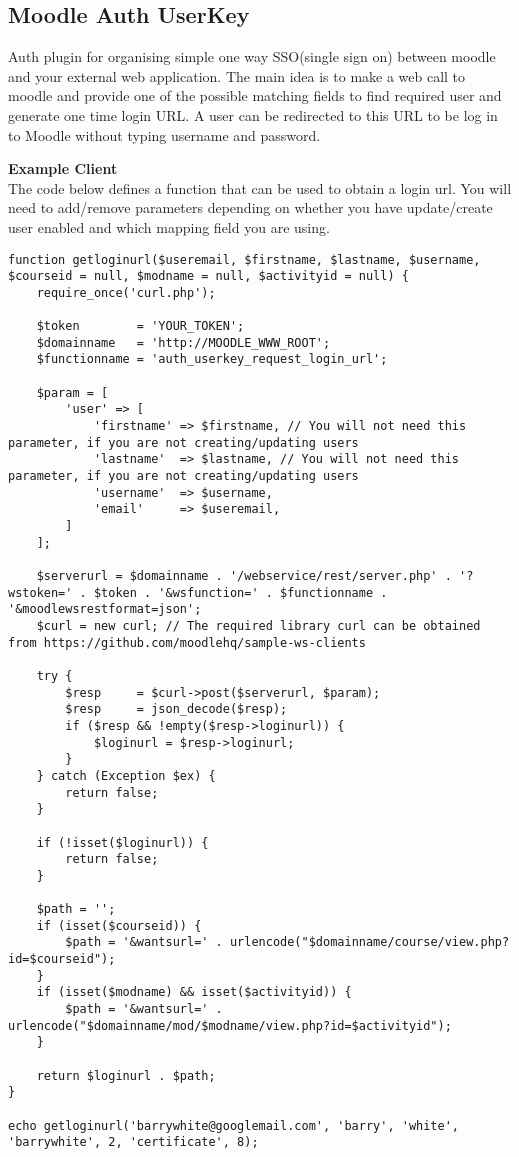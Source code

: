 \subsection{Moodle Auth UserKey}
Auth plugin for organising simple one way SSO(single sign on) between moodle and your external web application. The main idea is to make a web call to moodle and provide one of the possible matching fields to find required user and generate one time login URL. A user can be redirected to this URL to be log in to Moodle without typing username and password.

\textbf{Example Client}\\
The code below defines a function that can be used to obtain a login url. You will need to add/remove parameters depending on whether you have update/create user enabled and which mapping field you are using.

\begin{verbatim}
function getloginurl($useremail, $firstname, $lastname, $username, $courseid = null, $modname = null, $activityid = null) {
    require_once('curl.php');
        
    $token        = 'YOUR_TOKEN';
    $domainname   = 'http://MOODLE_WWW_ROOT';
    $functionname = 'auth_userkey_request_login_url';

    $param = [
        'user' => [
            'firstname' => $firstname, // You will not need this parameter, if you are not creating/updating users
            'lastname'  => $lastname, // You will not need this parameter, if you are not creating/updating users
            'username'  => $username, 
            'email'     => $useremail,
        ]
    ];

    $serverurl = $domainname . '/webservice/rest/server.php' . '?wstoken=' . $token . '&wsfunction=' . $functionname . '&moodlewsrestformat=json';
    $curl = new curl; // The required library curl can be obtained from https://github.com/moodlehq/sample-ws-clients 

    try {
        $resp     = $curl->post($serverurl, $param);
        $resp     = json_decode($resp);
        if ($resp && !empty($resp->loginurl)) {
            $loginurl = $resp->loginurl;        
        }
    } catch (Exception $ex) {
        return false;
    }

    if (!isset($loginurl)) {
        return false;
    }

    $path = '';
    if (isset($courseid)) {
        $path = '&wantsurl=' . urlencode("$domainname/course/view.php?id=$courseid");
    }
    if (isset($modname) && isset($activityid)) {
        $path = '&wantsurl=' . urlencode("$domainname/mod/$modname/view.php?id=$activityid");
    }

    return $loginurl . $path;
}

echo getloginurl('barrywhite@googlemail.com', 'barry', 'white', 'barrywhite', 2, 'certificate', 8);
\end{verbatim}

